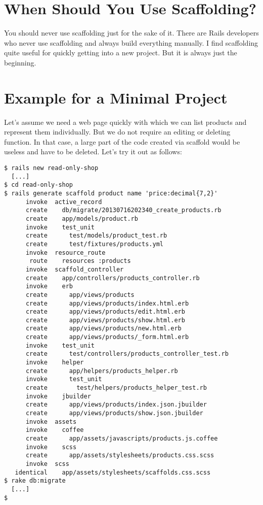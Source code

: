 \documentclass[a4paper]{book}
\begin{document}
\section{When Should You Use Scaffolding?}\label{when-should-you-use-scaffolding}

You should never use scaffolding just for the sake of it. There are Rails developers who never use scaffolding and always build everything manually. I find scaffolding quite useful for quickly getting into a new project. But it is always just the beginning.

\section{Example for a Minimal Project}\label{example-for-a-minimal-project}

Let's assume we need a web page quickly with which we can list products and represent them individually. But we do not require an editing or deleting function. In that case, a large part of the code created via scaffold would be useless and have to be deleted. Let's try it out as follows:

\begin{shaded}\begin{verbatim}
$ rails new read-only-shop
  [...]
$ cd read-only-shop
$ rails generate scaffold product name 'price:decimal{7,2}'
      invoke  active_record
      create    db/migrate/20130716202340_create_products.rb
      create    app/models/product.rb
      invoke    test_unit
      create      test/models/product_test.rb
      create      test/fixtures/products.yml
      invoke  resource_route
       route    resources :products
      invoke  scaffold_controller
      create    app/controllers/products_controller.rb
      invoke    erb
      create      app/views/products
      create      app/views/products/index.html.erb
      create      app/views/products/edit.html.erb
      create      app/views/products/show.html.erb
      create      app/views/products/new.html.erb
      create      app/views/products/_form.html.erb
      invoke    test_unit
      create      test/controllers/products_controller_test.rb
      invoke    helper
      create      app/helpers/products_helper.rb
      invoke      test_unit
      create        test/helpers/products_helper_test.rb
      invoke    jbuilder
      create      app/views/products/index.json.jbuilder
      create      app/views/products/show.json.jbuilder
      invoke  assets
      invoke    coffee
      create      app/assets/javascripts/products.js.coffee
      invoke    scss
      create      app/assets/stylesheets/products.css.scss
      invoke  scss
   identical    app/assets/stylesheets/scaffolds.css.scss
$ rake db:migrate
  [...]
$
\end{verbatim}\end{shaded}
\end{document}
